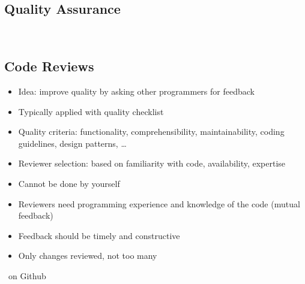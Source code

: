 \subsection{Quality Assurance}
\begin{frame}{\insertsubsection\ \mytitlesource{\ludewiglichter}}
\end{frame}

\subsection{Code Reviews} %
\begin{frame}{\insertsubsection}
	\begin{fancycolumns}
		\begin{definition}{}
			\begin{itemize}
				\item Idea: improve quality by asking other programmers for feedback
				\item Typically applied with quality checklist
				\item Quality criteria: functionality, comprehensibility, maintainability, coding guidelines, design patterns, \ldots
				\item Reviewer selection: based on familiarity with code, availability, expertise
			\end{itemize}
		\end{definition}
		\nextcolumn
		\begin{note}{}
			\begin{itemize}
				\item Cannot be done by yourself
				\item Reviewers need programming experience and knowledge of the code (mutual feedback)
				\item Feedback should be timely and constructive
				\item Only changes reviewed, not too many
			\end{itemize}
		\end{note}
		\hfill
	\end{fancycolumns}
\end{frame}

\begin{frame}{\insertsubsection\ on Github}
\end{frame}
